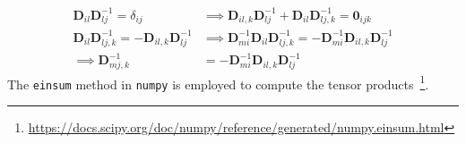 \documentclass[10pt]{article}
\begin{document}
\begin{align*}
  \mathbf{D}_{il}\mathbf{D}^{-1}_{lj} = \delta_{ij} &\implies
                                                      \mathbf{D}_{il,k}\mathbf{D}^{-1}_{lj}
                                                      +
                                                      \mathbf{D}_{il}\mathbf{D}^{-1}_{lj,k}
                                                      =
                                                      \mathbf{0}_{ijk}\\
  \mathbf{D}_{il}\mathbf{D}^{-1}_{lj,k} =
  -\mathbf{D}_{il,k}\mathbf{D}^{-1}_{lj} &\implies
                                           \mathbf{D}^{-1}_{mi}\mathbf{D}_{il}\mathbf{D}^{-1}_{lj,k}
                                           =
                                           -\mathbf{D}^{-1}_{mi}\mathbf{D}_{il,k}\mathbf{D}^{-1}_{lj}\\
  \implies \mathbf{D}^{-1}_{mj,k} &= -\mathbf{D}^{-1}_{mi}\mathbf{D}_{il,k}\mathbf{D}^{-1}_{lj}
\end{align*}
The \texttt{einsum} method in \texttt{numpy} is employed to compute
the tensor
products~\footnote{\url{https://docs.scipy.org/doc/numpy/reference/generated/numpy.einsum.html}}. 
\end{document}
